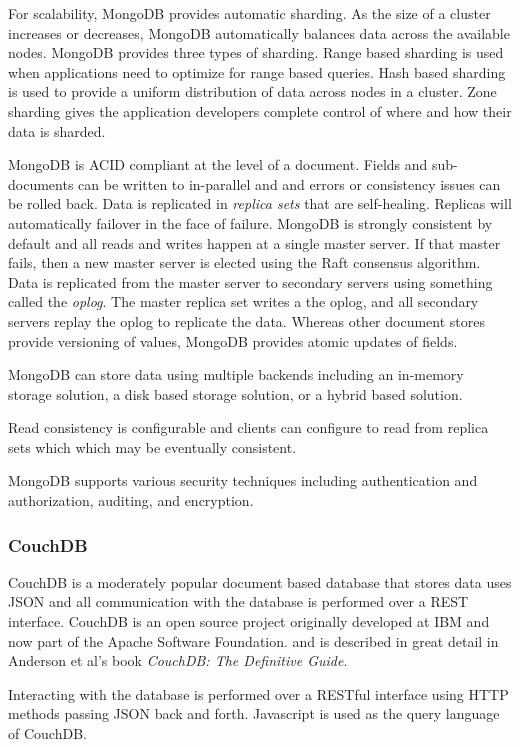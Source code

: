 \documentclass[]{article}
\begin{document}
For scalability, MongoDB provides automatic sharding. As the size of a cluster increases or decreases, MongoDB automatically balances data across the available nodes. MongoDB provides three types of sharding. Range based sharding is used when applications need to optimize for range based queries. Hash based sharding is used to provide a uniform distribution of data across nodes in a cluster. Zone sharding gives the application developers complete control of where and how their data is sharded.

MongoDB is ACID compliant at the level of a document. Fields and sub-documents can be written to in-parallel and and errors or consistency issues can be rolled back. Data is replicated in \textit{replica sets} that are self-healing. Replicas will automatically failover in the face of failure. MongoDB is strongly consistent by default and all reads and writes happen at a single master server. If that master fails, then a new master server is elected using the Raft consensus algorithm.  Data is replicated from the master server to secondary servers using something called the \textit{oplog}. The master replica set writes a the oplog, and all secondary servers replay the oplog to replicate the data. Whereas other document stores provide versioning of values, MongoDB provides atomic updates of fields\cite{cattell_scalable_2011}.

MongoDB can store data using multiple backends including an in-memory storage solution, a disk based storage solution, or a hybrid based solution. 

Read consistency is configurable and clients can configure to read from replica sets which which may be eventually consistent.

MongoDB supports various security techniques including authentication and authorization, auditing, and encryption. 

\subsubsection{CouchDB}
CouchDB is a moderately popular document based database that stores data uses JSON and all communication with the database is performed over a REST interface\cite{sharma_extended_2015}. CouchDB is an open source project originally developed at IBM and now part of the Apache Software Foundation. and is described in great detail in Anderson et al's book \textit{CouchDB: The Definitive Guide}\cite{anderson2010couchdb}.

Interacting with the database is performed over a RESTful interface using HTTP methods passing JSON back and forth. Javascript is used as the query language of CouchDB.
\end{document}
